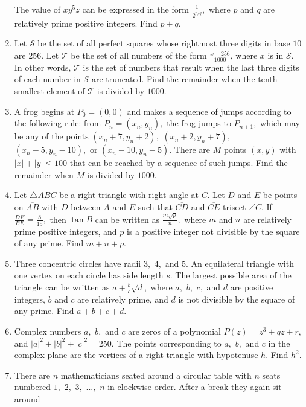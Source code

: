 \documentclass{article}
\begin{document}
\begin{enumerate}[label=\arabic*., itemsep=0.5em]
The value of \(xy^5z\) can be expressed in the form \(\frac{1}{2^{p/q}},\) where \(p\) and \(q\) are relatively prime positive integers. Find \(p+q.\)\par \vspace{0.5em}\item Let \(\mathcal{S}\) be the set of all perfect squares whose rightmost three digits in base \(10\) are \(256\). Let \(\mathcal{T}\) be the set of all numbers of the form \(\frac{x-256}{1000}\), where \(x\) is in \(\mathcal{S}\). In other words, \(\mathcal{T}\) is the set of numbers that result when the last three digits of each number in \(\mathcal{S}\) are truncated. Find the remainder when the tenth smallest element of \(\mathcal{T}\) is divided by \(1000\).\par \vspace{0.5em}\item A frog begins at \(P_0 = (0,0)\) and makes a sequence of jumps according to the following rule: from \(P_n = (x_n, y_n),\) the frog jumps to \(P_{n+1},\) which may be any of the points \((x_n + 7, y_n + 2),\) \((x_n + 2, y_n + 7),\) \((x_n - 5, y_n - 10),\) or \((x_n - 10, y_n - 5).\) There are \(M\) points \((x, y)\) with \(|x| + |y| \le 100\) that can be reached by a sequence of such jumps. Find the remainder when \(M\) is divided by \(1000.\)\par \vspace{0.5em}\item Let \(\triangle ABC\) be a right triangle with right angle at \(C.\) Let \(D\) and \(E\) be points on \(\overline{AB}\) with \(D\) between \(A\) and \(E\) such that \(\overline{CD}\) and \(\overline{CE}\) trisect \(\angle C.\) If \(\frac{DE}{BE} = \frac{8}{15},\) then \(\tan B\) can be written as \(\frac{m \sqrt{p}}{n},\) where \(m\) and \(n\) are relatively prime positive integers, and \(p\) is a positive integer not divisible by the square of any prime. Find \(m+n+p.\)\par \vspace{0.5em}\item Three concentric circles have radii \(3,\) \(4,\) and \(5.\) An equilateral triangle with one vertex on each circle has side length \(s.\) The largest possible area of the triangle can be written as \(a + \tfrac{b}{c} \sqrt{d},\) where \(a,\) \(b,\) \(c,\) and \(d\) are positive integers, \(b\) and \(c\) are relatively prime, and \(d\) is not divisible by the square of any prime. Find \(a+b+c+d.\)\par \vspace{0.5em}\item Complex numbers \(a,\) \(b,\) and \(c\) are zeros of a polynomial \(P(z) = z^3 + qz + r,\) and \(|a|^2 + |b|^2 + |c|^2 = 250.\) The points corresponding to \(a,\) \(b,\) and \(c\) in the complex plane are the vertices of a right triangle with hypotenuse \(h.\) Find \(h^2.\)\par \vspace{0.5em}\item There are \(n\) mathematicians seated around a circular table with \(n\) seats numbered \(1,\) \(2,\) \(3,\) \(...,\) \(n\) in clockwise order. After a break they again sit around 
\end{enumerate}
\end{document}
